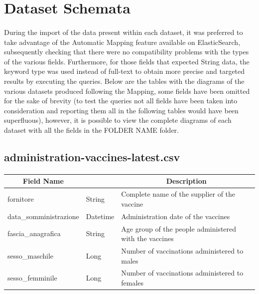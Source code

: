 \documentclass[a4paper,12pt]{article}
\begin{document}
\section{Dataset Schemata}
\paragraph{} During the import of the data present within each dataset, it was preferred to take advantage of the Automatic Mapping feature available on ElasticSearch, subsequently checking that there were no compatibility problems with the types of the various fields. Furthermore, for those fields that expected String data, the keyword type was used instead of full-text to obtain more precise and targeted results by executing the queries. Below are the tables with the diagrams of the various datasets produced following the Mapping, some fields have been omitted for the sake of brevity (to test the queries not all fields have been taken into consideration and reporting them all in the following tables would have been superfluous), however, it is possible to view the complete diagrams of each dataset with all the fields in the FOLDER NAME folder.
\subsection{administration-vaccines-latest.csv}
\paragraph{}
\begin{center}
\begin{tabular}{|m{45mm}|>{\raggedright}m{16mm}|m{75mm}|}
\hline
\multicolumn{1}{|c|}{\textbf{ Field Name }}
& \multicolumn{1}{c|}{\textbf{ Data Type }} 
    	& \multicolumn{1}{c|}{\textbf{ Description }}\\
\hline
fornitore & String & Complete name of the supplier of the vaccine \\
\hline
data\_somministrazione & Datetime & Administration date of the vaccines \\
\hline
fascia\_anagrafica & String & Age group of the people administered with the vaccines \\
\hline
sesso\_maschile & Long & Number of vaccinations administered to males \\
\hline
sesso\_femminile & Long & Number of vaccinations administered to females \\
\hline
\end{tabular}
\end{center}
\end{document}

